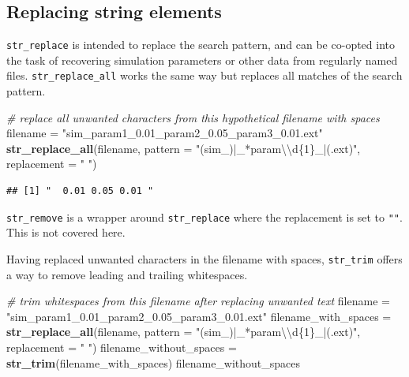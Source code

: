 \documentclass[]{book}
\newenvironment{Shaded}{}{}
\newcommand{\CharTok}[1]{\textcolor[rgb]{0.25,0.44,0.63}{#1}}
\newcommand{\CommentTok}[1]{\textcolor[rgb]{0.38,0.63,0.69}{\textit{#1}}}
\newcommand{\DataTypeTok}[1]{\textcolor[rgb]{0.56,0.13,0.00}{#1}}
\newcommand{\KeywordTok}[1]{\textcolor[rgb]{0.00,0.44,0.13}{\textbf{#1}}}
\newcommand{\NormalTok}[1]{#1}
\newcommand{\StringTok}[1]{\textcolor[rgb]{0.25,0.44,0.63}{#1}}
\begin{document}
\hypertarget{replacing-string-elements}{%
\subsection{Replacing string elements}\label{replacing-string-elements}}

\texttt{str\_replace} is intended to replace the search pattern, and can be co-opted into the task of recovering simulation parameters or other data from regularly named files. \texttt{str\_replace\_all} works the same way but replaces all matches of the search pattern.

\begin{Shaded}
\begin{Highlighting}[]
\CommentTok{# replace all unwanted characters from this hypothetical filename with spaces}
\NormalTok{filename =}\StringTok{ "sim_param1_0.01_param2_0.05_param3_0.01.ext"}
\KeywordTok{str_replace_all}\NormalTok{(filename,}
                \DataTypeTok{pattern =} \StringTok{"(sim_)|_*param}\CharTok{\textbackslash{}\textbackslash{}}\StringTok{d\{1\}_|(.ext)"}\NormalTok{,}
                \DataTypeTok{replacement =} \StringTok{" "}\NormalTok{)}
\end{Highlighting}
\end{Shaded}

\begin{verbatim}
## [1] "  0.01 0.05 0.01 "
\end{verbatim}

\texttt{str\_remove} is a wrapper around \texttt{str\_replace} where the replacement is set to \texttt{""}. This is not covered here.

Having replaced unwanted characters in the filename with spaces, \texttt{str\_trim} offers a way to remove leading and trailing whitespaces.

\begin{Shaded}
\begin{Highlighting}[]
\CommentTok{# trim whitespaces from this filename after replacing unwanted text}
\NormalTok{filename =}\StringTok{ "sim_param1_0.01_param2_0.05_param3_0.01.ext"}
\NormalTok{filename_with_spaces =}\StringTok{ }\KeywordTok{str_replace_all}\NormalTok{(filename,}
                                       \DataTypeTok{pattern =} \StringTok{"(sim_)|_*param}\CharTok{\textbackslash{}\textbackslash{}}\StringTok{d\{1\}_|(.ext)"}\NormalTok{,}
                                       \DataTypeTok{replacement =} \StringTok{" "}\NormalTok{)}
\NormalTok{filename_without_spaces =}\StringTok{ }\KeywordTok{str_trim}\NormalTok{(filename_with_spaces)}
\NormalTok{filename_without_spaces}
\end{Highlighting}
\end{Shaded}
\end{document}
